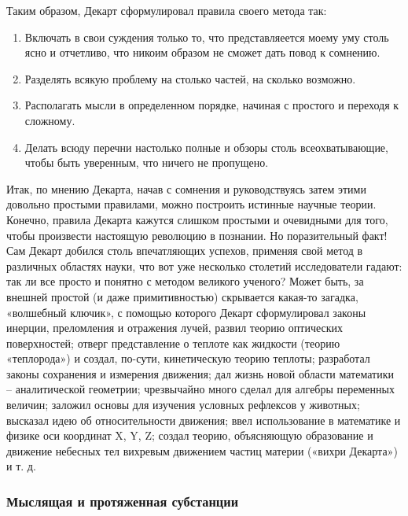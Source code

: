 \documentclass[a4paper, 14pt]{extreport}
\begin{document}
Таким образом, Декарт сформулировал правила своего метода так:

\begin{enumerate}
\def\labelenumi{\arabic{enumi}.}

\item
  Включать в свои суждения только то, что представляеется моему уму
  столь ясно и отчетливо, что никоим образом не сможет дать повод к
  сомнению.
\item
  Разделять всякую проблему на столько частей, на сколько возможно.
\item
  Располагать мысли в определенном порядке, начиная с простого и
  переходя к сложному.
\item
  Делать всюду перечни настолько полные и обзоры столь всеохватывающие,
  чтобы быть уверенным, что ничего не пропущено.
\end{enumerate}

Итак, по мнению Декарта, начав с сомнения и руководствуясь затем этими
довольно простыми правилами, можно построить истинные научные теории.
Конечно, правила Декарта кажутся слишком простыми и очевидными для того,
чтобы произвести настоящую революцию в познании. Но поразительный факт!
Сам Декарт добился столь впечатляющих успехов, применяя свой метод в
различных областях науки, что вот уже несколько столетий исследователи
гадают: так ли все просто и понятно с методом великого ученого? Может
быть, за внешней простой (и даже примитивностью) скрывается какая-то
загадка, «волшебный ключик», с помощью которого Декарт сформулировал
законы инерции, преломления и отражения лучей, развил теорию оптических
поверхностей; отверг представление о теплоте как жидкости (теорию
«теплорода») и создал, по-сути, кинетическую теорию теплоты; разработал
законы сохранения и измерения движения; дал жизнь новой области
математики -- аналитической геометрии; чрезвычайно много сделал для
алгебры переменных величин; заложил основы для изучения условных
рефлексов у животных; высказал идею об относительности движения; ввел
использование в математике и физике оси координат X, Y, Z; создал
теорию, объясняющую образование и движение небесных тел вихревым
движением частиц материи («вихри Декарта») и т. д.

\subsubsection{Мыслящая и протяженная субстанции}
\end{document}
